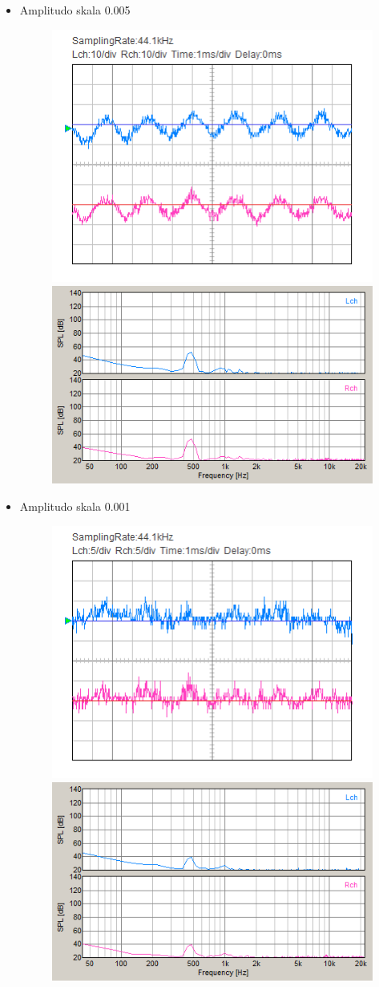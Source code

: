 \documentclass[12pt,]{article}
\begin{document}
\begin{itemize}
\begin{itemize}
			\item Amplitudo skala 0.005
			\begin{figure}[H]
				\centering
				\includegraphics[width=0.45\linewidth]{result/day_4/500Hz/tone0005}
				\includegraphics[width=0.45\linewidth]{result/day_4/500Hz/fft_tone0005}
			\end{figure}
		
			\newpage
			\item Amplitudo skala 0.001
			\begin{figure}[H]
				\centering
				\includegraphics[width=0.45\linewidth]{result/day_4/500Hz/tone0001}
				\includegraphics[width=0.45\linewidth]{result/day_4/500Hz/fft_tone0001}
			\end{figure}
		

\end{itemize}
\end{itemize}
\end{document}

